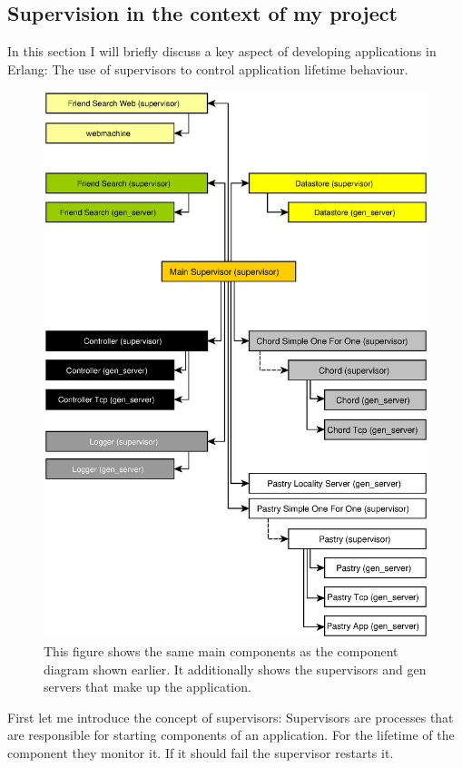 
\subsection{Supervision in the context of my project}
In this section I will briefly discuss a key aspect of developing applications in Erlang: The use of supervisors to control application lifetime behaviour.

\begin{figure}[!htb]
\begin{center}
	\includegraphics[width=0.9\linewidth]{illustrations/ClientSupervisionTree.eps}
  \caption{This figure shows the same main components as the component diagram shown earlier. It additionally shows the supervisors and gen servers that make up the application.}
  \label{supervisionTree}
\end{center}
\end{figure}

First let me introduce the concept of supervisors:
Supervisors are processes that are responsible for starting components of an application. For the lifetime of the component they monitor it. If it should fail the supervisor restarts it.

